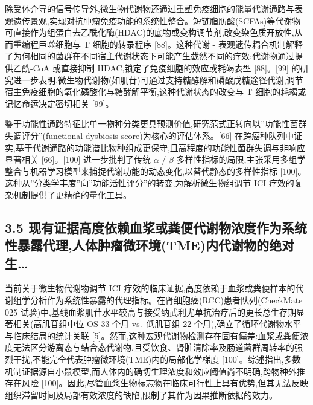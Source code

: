 除受体介导的信号传导外,微生物代谢物还通过重塑免疫细胞的能量代谢通路与表观遗传景观,实现对抗肿瘤免疫功能的系统性整合。短链脂肪酸(SCFAs)等代谢物可直接作为组蛋白去乙酰化酶(HDAC)的底物或变构调节剂,改变染色质开放性,从而重编程巨噬细胞与 T 细胞的转录程序 {[}88{]}。这种代谢 - 表观遗传耦合机制解释了为何相同的菌群在不同宿主代谢状态下可能产生截然不同的疗效:代谢物通过提供乙酰-CoA 或直接抑制 HDAC,锁定了免疫细胞的效应或耗竭表型 {[}88{]}。{[}99{]} 的研究进一步表明,微生物代谢物(如肌苷)可通过支持糖酵解和磷酸戊糖途径代谢,调节宿主免疫细胞的氧化磷酸化与糖酵解平衡,这种代谢状态的改变与 T 细胞的耗竭或记忆命运决定密切相关 {[}99{]}。

鉴于功能性通路特征比单一物种分类更具预测价值,研究范式正转向以''功能性菌群失调评分''(functional dysbiosis score)为核心的评估体系。{[}66{]} 在跨癌种队列中证实,基于代谢通路的功能谱比物种组成更保守,且高程度的功能性菌群失调与非响应显著相关 {[}66{]}。{[}100{]} 进一步批判了传统 \(\alpha\) / \(\beta\) 多样性指标的局限,主张采用多组学整合与机器学习模型来捕捉代谢功能的动态变化,以替代静态的多样性指标 {[}100{]}。这种从''分类学丰度''向''功能活性评分''的转变,为解析微生物组调节 ICI 疗效的复杂机制提供了更精确的量化工具。

\subsection{3.5 现有证据高度依赖血浆或粪便代谢物浓度作为系统性暴露代理,人体肿瘤微环境(TME)内代谢物的绝对生\ldots{}}\label{ux73b0ux6709ux8bc1ux636eux9ad8ux5ea6ux4f9dux8d56ux8840ux6d46ux6216ux7caaux4fbfux4ee3ux8c22ux7269ux6d53ux5ea6ux4f5cux4e3aux7cfbux7edfux6027ux66b4ux9732ux4ee3ux7406ux4ebaux4f53ux80bfux7624ux5faeux73afux5883tmeux5185ux4ee3ux8c22ux7269ux7684ux7eddux5bf9ux751f}

当前关于微生物代谢物调节 ICI 疗效的临床证据,高度依赖于血浆或粪便样本的代谢组学分析作为系统性暴露的代理指标。在肾细胞癌(RCC)患者队列(CheckMate 025 试验)中,基线血浆肌苷水平较高与接受纳武利尤单抗治疗后的更长总生存期显著相关(高肌苷组中位 OS 33 个月 vs.~低肌苷组 22 个月),确立了循环代谢物水平与临床结局的统计关联 {[}5{]}。然而,这种宏观代谢物检测存在固有偏差:血浆或粪便浓度无法区分游离态与结合态代谢物,且受饮食、肾脏清除率及肠道菌群周转率的强烈干扰,不能完全代表肿瘤微环境(TME)内的局部化学梯度 {[}100{]}。综述指出,多数机制证据源自小鼠模型,而人体内的确切生理浓度和效应阈值尚不明确,跨物种外推存在风险 {[}100{]}。因此,尽管血浆生物标志物在临床可行性上具有优势,但其无法反映组织滞留时间及局部有效浓度的缺陷,限制了其作为因果推断依据的效力。

